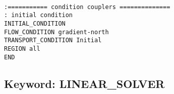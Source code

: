 \documentclass[12pt]{article}
\begin{document}


\begin{verbatim}

:=========== condition couplers ==============
: initial condition
INITIAL_CONDITION
FLOW_CONDITION gradient-north
TRANSPORT_CONDITION Initial
REGION all
END
\end{verbatim}


\newpage
\protect\hypertarget{target_linsolv}{}

\subsection{Keyword: LINEAR\_SOLVER}

\end{document}
